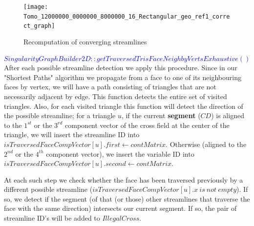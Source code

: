 \documentclass[a4paper]{report}
\begin{document}
{{\begin{figure}[h]
\texttt{[image: Tomo\_12000000\_0000000\_8000000\_16\_Rectangular\_geo\_ref1\_correct\_graph]}
\caption{Recomputation of converging streamlines}
\label{fig:ex3}
\end{figure}

\bigskip
\textcolor{blue}{$SingularityGraphBuilder2D::getTraversedTrisFaceNeighbyVertsExhaustive()$}
		After each possible streamline detection we apply this procedure. Since in our "Shortest Paths" algorithm we propagate from a face to one of its neighbouring faces by vertex, we will have a path consisting of triangles that are not necessarily adjacent by edge. This function detects the entire set of visited triangles. 
		Also, for each visited triangle this function will detect the direction of the possible streamline; for a triangle $u$, if the current \textbf{segment} ($CD$) is aligned to the $1^{st}$ or the $3^{rd}$ component vector of the cross field at the center of the triangle, we will insert the streamline ID into \textcolor{myGreen}{$isTraversedFaceCompVector[u].first$}$ \leftarrow contMatrix$. Otherwise (aligned to the $2^{nd}$ or the $4^{th}$ component vector), we insert the variable ID into \textcolor{myGreen}{$isTraversedFaceCompVector[u].second$}$ \leftarrow contMatrix$.
		
		At each such step we check whether the face has been traversed previously by a different possible streamline (\textcolor{myGreen}{$isTraversedFaceCompVector[u].x\ is\ not\  empty$}). If so, we detect if the segment (of that (or those) other streamlines that traverse the face with the same direction) intersects our current segment. If so, the pair of streamline ID's will be added to \textcolor{myGreen}{$IllegalCross$}.
		
}}
\end{document}
